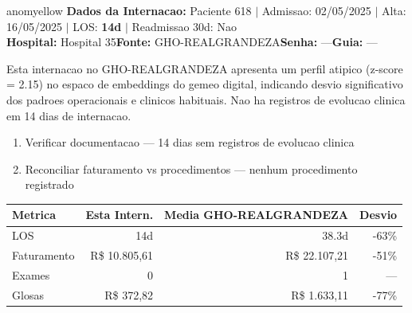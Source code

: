 \documentclass[a4paper,10pt]{article}
\begin{document}
\newpage

\begin{anomalycard}[Internacao 7323 | GHO-REALGRANDEZA | MODERADO (z=2.15)]{anomyellow}
\textbf{Dados da Internacao:} Paciente 618 $\mid$ Admissao: 02/05/2025 $\mid$ Alta: 16/05/2025 $\mid$ LOS: \textbf{14d} $\mid$ Readmissao 30d: Nao\\
\textbf{Hospital:} Hospital 35\quad\textbf{Fonte:} GHO-REALGRANDEZA\quad\textbf{Senha:} ---\quad\textbf{Guia:} ---\\
\vspace{2pt}\begin{tcolorbox}[colback=severityred!20,colframe=anomyellow,title={\textbf{Interpretacao de Negocio}},fonttitle=\bfseries\small,left=4pt,right=4pt,top=3pt,bottom=3pt]
{\small Esta internacao no GHO-REALGRANDEZA apresenta um perfil atipico (z-score = 2.15) no espaco de embeddings do gemeo digital, indicando desvio significativo dos padroes operacionais e clinicos habituais. Nao ha registros de evolucao clinica em 14 dias de internacao.}
\end{tcolorbox}
\begin{tcolorbox}[colback=severityyellow!30,colframe=anomorange,title={\textbf{Recomendacoes Especificas}},fonttitle=\bfseries\small,left=4pt,right=4pt,top=3pt,bottom=3pt]
\begin{enumerate}[nosep,leftmargin=16pt]
\item {\small Verificar documentacao --- 14 dias sem registros de evolucao clinica}
\item {\small Reconciliar faturamento vs procedimentos --- nenhum procedimento registrado}
\end{enumerate}
\end{tcolorbox}
\begin{center}\begin{tabular}{l r r r}\toprule\textbf{Metrica} & \textbf{Esta Intern.} & \textbf{Media GHO-REALGRANDEZA} & \textbf{Desvio} \\\midrule
LOS & 14d & 38.3d & -63\% \\
Faturamento & R\$ 10.805,61 & R\$ 22.107,21 & -51\% \\
Exames & 0 & 1 & --- \\
Glosas & R\$ 372,82 & R\$ 1.633,11 & -77\% \\
\bottomrule\end{tabular}\end{center}


\end{anomalycard}
\end{document}
